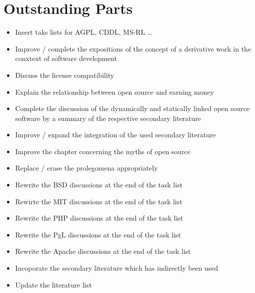 %
%
%
%


\chapter*{Outstanding Parts} 

\begin{footnotesize}
\begin{itemize}
  \item Insert taks lists for AGPL, CDDL, MS-RL \ldots
  \item Improve / complete the expositions of the concept of a derivative work
  in the conxtext of software development
  \item Discuss the license compatibility
  \item Explain the relationship between open source and earning money
  \item Complete the discussion of the dynamically and statically linked open
  source software by a summary of the respective secondary literature
  \item Improve / expand the integration of the used secondary literature
  \item Improve the chapter concerning the myths of open source
  \item Replace / erase the prolegomena appropriately
  \item Rewrite the BSD discussions at the end of the task list 
  \item Rewirte the MIT discussions at the end of the task list
  \item Rewrite the PHP discussions at the end of the task list
  \item Rewrite the PgL discussions at the end of the task list
  \item Rewrite the Apache discussions at the end of the task list
  \item Incoporate the secondary literature which has indirectly been used
  \item Update the literature list
\end{itemize}
\end{footnotesize}

%
